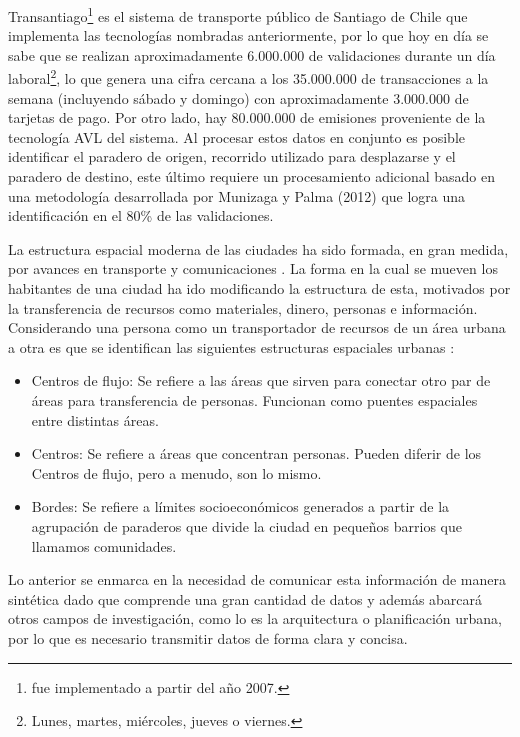 \documentclass[12pt]{article}
\begin{document}
    Transantiago\footnote{fue implementado a partir del año 2007.} es el sistema de transporte público de Santiago de Chile que implementa las tecnologías nombradas anteriormente, por lo que hoy en día se sabe que se realizan aproximadamente 6.000.000 de validaciones durante un día laboral\footnote{Lunes, martes, miércoles, jueves o viernes.}, lo que genera una cifra cercana a los 35.000.000 de transacciones a la semana (incluyendo sábado y domingo) con aproximadamente 3.000.000 de tarjetas de pago. Por otro lado, hay 80.000.000 de emisiones proveniente de la tecnología AVL del sistema. Al procesar estos datos en conjunto es posible identificar el paradero de origen, recorrido utilizado para desplazarse y el paradero de destino, este último requiere un procesamiento adicional basado en una metodología desarrollada por Munizaga y Palma (2012) \cite{Procesamiento_datos} que logra una identificación en el 80\% de las validaciones.

    La estructura espacial moderna de las ciudades ha sido formada, en gran medida, por avances en transporte y comunicaciones \cite{Forma_ciudad_moderna}. La forma en la cual se mueven los habitantes de una ciudad ha ido modificando la estructura de esta, motivados por la transferencia de recursos como materiales, dinero, personas e información. Considerando una persona como un transportador de recursos de un área urbana a otra es que se identifican las siguientes estructuras espaciales urbanas \cite{Estructura_urbana}:

    \begin{itemize}
    \item Centros de flujo: Se refiere a las áreas que sirven para conectar otro par de áreas para transferencia de personas. Funcionan como puentes espaciales entre distintas áreas.
    \item Centros: Se refiere a áreas que concentran personas. Pueden diferir de los Centros de flujo, pero a menudo, son lo mismo.
    \item Bordes: Se refiere a límites socioeconómicos generados a partir de la agrupación de paraderos que divide la ciudad en pequeños barrios que llamamos comunidades.
    \end{itemize}


    Lo anterior se enmarca en la necesidad de comunicar esta información de manera sintética dado que comprende una gran cantidad de datos y además abarcará otros campos de investigación, como lo es la arquitectura o planificación urbana, por lo que es necesario transmitir datos de forma clara y concisa.
\end{document}
